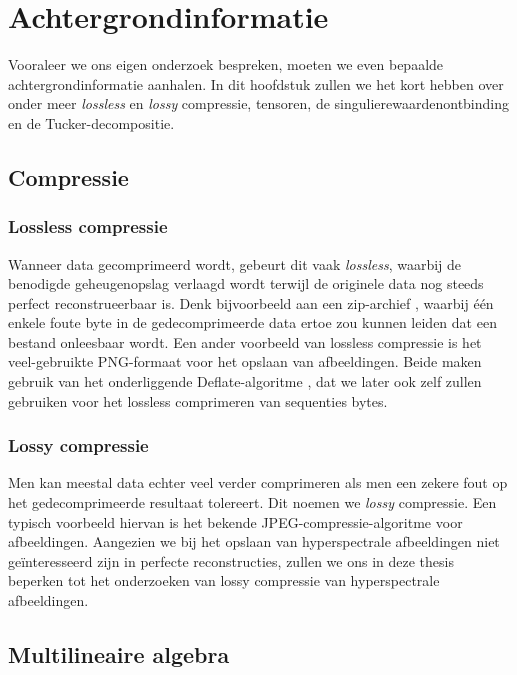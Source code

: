 \chapter{Achtergrondinformatie}
\label{hoofdstuk:achtergrond}

Vooraleer we ons eigen onderzoek bespreken, moeten we even bepaalde achtergrondinformatie aanhalen. In dit hoofdstuk zullen we het kort hebben over onder meer \textit{lossless} en \textit{lossy} compressie, tensoren, de singulierewaardenontbinding en de Tucker-decompositie.

\section{Compressie}

\subsection{Lossless compressie}

Wanneer data gecomprimeerd wordt, gebeurt dit vaak \textit{lossless}, waarbij de benodigde geheugenopslag verlaagd wordt terwijl de originele data nog steeds perfect reconstrueerbaar is. Denk bijvoorbeeld aan een zip-archief \cite{ref:zip}, waarbij \'e\'en enkele foute byte in de gedecomprimeerde data ertoe zou kunnen leiden dat een bestand onleesbaar wordt. Een ander voorbeeld van lossless compressie is het veel-gebruikte PNG-formaat \cite{ref:png} voor het opslaan van afbeeldingen. Beide maken gebruik van het onderliggende Deflate-algoritme \cite{ref:deflate}, dat we later ook zelf zullen gebruiken voor het lossless comprimeren van sequenties bytes.

\subsection{Lossy compressie}

Men kan meestal data echter veel verder comprimeren als men een zekere fout op het gedecomprimeerde resultaat tolereert. Dit noemen we \textit{lossy} compressie. Een typisch voorbeeld hiervan is het bekende JPEG-compressie-algoritme \cite{ref:jpeg} voor afbeeldingen. Aangezien we bij het opslaan van hyperspectrale afbeeldingen niet ge\"interesseerd zijn in perfecte reconstructies, zullen we ons in deze thesis beperken tot het onderzoeken van lossy compressie van hyperspectrale afbeeldingen.

\newpage
\section{Multilineaire algebra}

